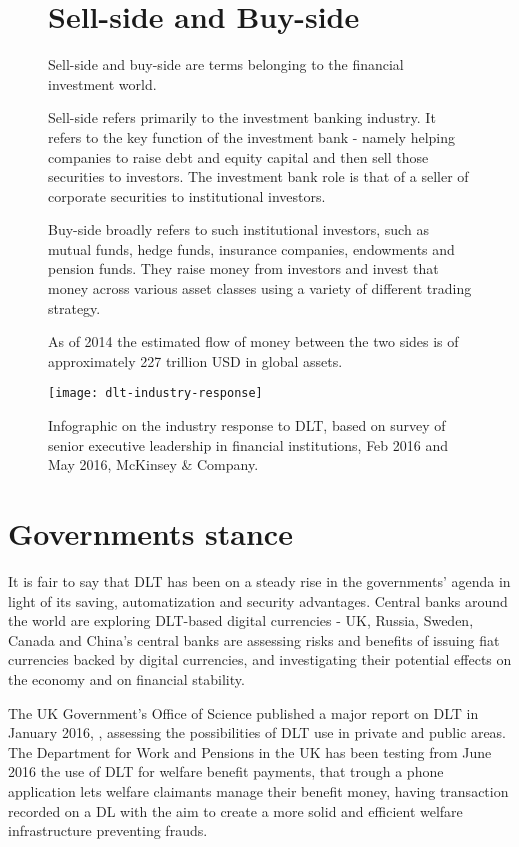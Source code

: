 \begin{figure}[b]
    \begin{tcolorbox}[colframe=boxcolor]
        \section*{Sell-side and Buy-side}
        Sell-side and buy-side are terms belonging to the financial investment world.

        Sell-side refers primarily to the investment banking industry. It refers to the key function of the investment bank - namely helping companies to raise debt and equity capital and then sell those securities to investors. The investment bank role is that of a seller of corporate securities to institutional investors.

        Buy-side broadly refers to such institutional investors, such as mutual funds, hedge funds, insurance companies, endowments and pension funds. They raise money from investors and invest that money across various asset classes using a variety of different trading strategy.

        As of 2014 the estimated flow of money between the two sides is of approximately 227 trillion USD in global assets.
    \end{tcolorbox}
\end{figure}

\begin{figure}[t]
    \centering
    \texttt{[image: dlt-industry-response]}
    \caption{
        Infographic on the industry response to DLT, based on survey of senior executive leadership in financial institutions, Feb 2016 and May 2016, McKinsey \& Company.
        }
\end{figure}

\section{Governments stance}


It is fair to say that DLT has been on a steady rise in the governments' agenda in light of its saving, automatization and security advantages.
Central banks around the world are exploring DLT-based digital currencies - UK, Russia, Sweden, Canada and China's central banks are assessing risks and benefits of issuing fiat currencies backed by digital currencies, and investigating their potential effects on the economy and on financial stability.

The UK Government's Office of Science published a major report on DLT in January 2016, \cite{ukgovdltpaper}, assessing the possibilities of DLT use in private and public areas. The Department for Work and Pensions in the UK has been testing from June 2016 the use of DLT for welfare benefit payments, that trough a phone application lets welfare claimants manage their benefit money, having transaction recorded on a DL with the aim to create a more solid and efficient welfare infrastructure preventing frauds.

